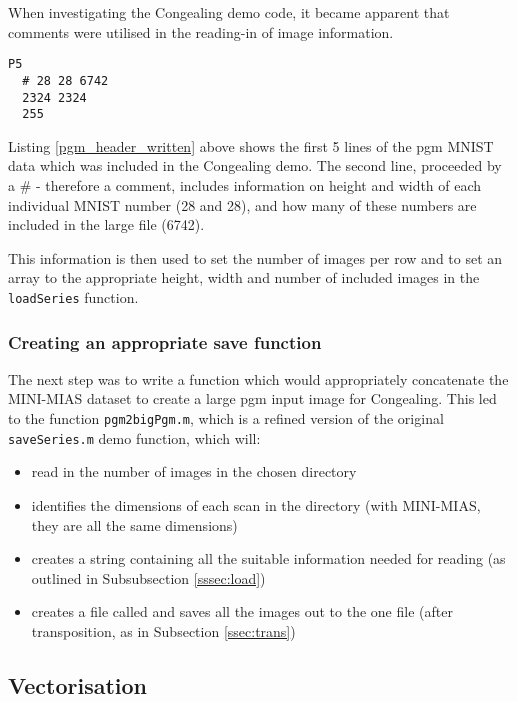  When investigating the Congealing demo code, it became apparent that comments were utilised in the reading-in of image information.

\begin{lstlisting}[style=Matlab-editor,frame=single,label=pgm_header_written, caption=Example MNIST PGM file header]
  P5
  # 28 28 6742
  2324 2324
  255
\end{lstlisting}


Listing \ref{pgm_header_written} above shows the first 5 lines of the \acrshort{pgm} MNIST data which was included in the Congealing demo. The second line, proceeded by a \# - therefore a comment, includes information on height and width of each individual MNIST number (28 and 28), and how many of these numbers are included in the large file (6742).

This information is then used to set the number of images per row and to set an array to the appropriate height, width and number of included images in the \texttt{loadSeries} function.


\subsubsection{Creating an appropriate save function}

The next step was to write a function which would appropriately concatenate the MINI-MIAS dataset \cite{Suckling_1994} to create a large \acrshort{pgm} input image for Congealing. This led to the function \texttt{pgm2bigPgm.m}, which is a refined version of the original \texttt{saveSeries.m} demo function, which will:
\begin{itemize}
\item read in the number of images in the chosen directory
\item identifies the dimensions of each scan in the directory (with MINI-MIAS, they are all the same dimensions)
\item creates a string containing all the suitable information needed for reading (as outlined in Subsubsection \ref{sssec:load})
\item creates a file called  and saves all the images out to the one file (after transposition, as in Subsection \ref{ssec:trans})
\end{itemize}

\subsection{Vectorisation}

